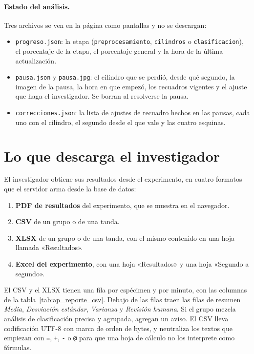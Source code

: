 \paragraph{Estado del análisis.} Tres archivos se ven en la página como pantallas y no
se descargan:
\begin{itemize}
\item \texttt{progreso.json}: la etapa (\texttt{preprocesamiento}, \texttt{cilindros} o
\texttt{clasificacion}), el porcentaje de la etapa, el porcentaje general y la hora de
la última actualización.
\item \texttt{pausa.json} y \texttt{pausa.jpg}: el cilindro que se perdió, desde qué
segundo, la imagen de la pausa, la hora en que empezó, los recuadros vigentes y el
ajuste que haga el investigador. Se borran al resolverse la pausa.
\item \texttt{correcciones.json}: la lista de ajustes de recuadro hechos en las pausas,
cada uno con el cilindro, el segundo desde el que vale y las cuatro esquinas.
\end{itemize}

\section{Lo que descarga el investigador}

El investigador obtiene sus resultados desde el experimento, en cuatro formatos que el
servidor arma desde la base de datos:

\begin{enumerate}
\item \textbf{PDF de resultados} del experimento, que se muestra en el navegador.
\item \textbf{CSV} de un grupo o de una tanda.
\item \textbf{XLSX} de un grupo o de una tanda, con el mismo contenido en una hoja
llamada «Resultados».
\item \textbf{Excel del experimento}, con una hoja «Resultados» y una hoja «Segundo a
segundo».
\end{enumerate}

El CSV y el XLSX tienen una fila por espécimen y por minuto, con las columnas de la
tabla~\ref{tab:ap_reporte_csv}. Debajo de las filas traen las filas de resumen
\textit{Media}, \textit{Desviación estándar}, \textit{Varianza} y \textit{Revisión
humana}. Si el grupo mezcla análisis de clasificación precisa y agrupada, agregan un
aviso. El CSV lleva codificación UTF-8 con marca de orden de bytes, y neutraliza los
textos que empiezan con \texttt{=}, \texttt{+}, \texttt{-} o \texttt{@} para que una
hoja de cálculo no los interprete como fórmulas.

